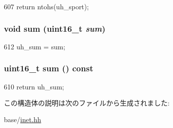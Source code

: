 \begin{DoxyCode}
607 { return ntohs(uh_sport); }
\end{DoxyCode}
\hypertarget{structNet_1_1UdpHdr_ae0171ec0578adacce8cceb6a804f97f1}{
\subsubsection[{sum}]{\setlength{\rightskip}{0pt plus 5cm}void sum (uint16\_\-t {\em sum})}}
\label{structNet_1_1UdpHdr_ae0171ec0578adacce8cceb6a804f97f1}



\begin{DoxyCode}
612 { uh_sum = sum; }
\end{DoxyCode}
\hypertarget{structNet_1_1UdpHdr_acbf3c502c7393ef0178454b237b2562f}{
\subsubsection[{sum}]{\setlength{\rightskip}{0pt plus 5cm}uint16\_\-t sum () const}}
\label{structNet_1_1UdpHdr_acbf3c502c7393ef0178454b237b2562f}



\begin{DoxyCode}
610 { return uh_sum; }
\end{DoxyCode}


この構造体の説明は次のファイルから生成されました:\begin{DoxyCompactItemize}
\item 
base/\hyperlink{inet_8hh}{inet.hh}\end{DoxyCompactItemize}
